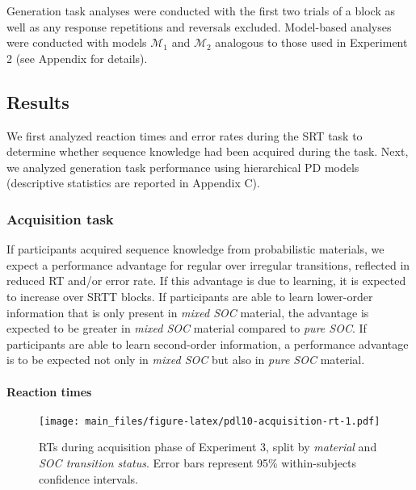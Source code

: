 \documentclass[man]{apa6}
\theoremstyle{definition}
\theoremstyle{definition}
\theoremstyle{definition}
\theoremstyle{remark}
\begin{document}
Generation task analyses were conducted with the first two trials of a
block as well as any response repetitions and reversals excluded.
Model-based analyses were conducted with models \(\mathcal{M}_1\) and
\(\mathcal{M}_2\) analogous to those used in Experiment 2 (see Appendix
for details).

\subsection{Results}\label{results-2}

We first analyzed reaction times and error rates during the SRT task to
determine whether sequence knowledge had been acquired during the task.
Next, we analyzed generation task performance using hierarchical PD
models (descriptive statistics are reported in Appendix C).

\subsubsection{Acquisition task}\label{acquisition-task-2}

If participants acquired sequence knowledge from probabilistic
materials, we expect a performance advantage for regular over irregular
transitions, reflected in reduced RT and/or error rate. If this
advantage is due to learning, it is expected to increase over SRTT
blocks. If participants are able to learn lower-order information that
is only present in \emph{mixed SOC} material, the advantage is expected
to be greater in \emph{mixed SOC} material compared to \emph{pure SOC}.
If participants are able to learn second-order information, a
performance advantage is to be expected not only in \emph{mixed SOC} but
also in \emph{pure SOC} material.

\paragraph{Reaction times}\label{reaction-times-2}

\begin{figure}[htbp]
\centering
\texttt{[image: main\_files/figure-latex/pdl10-acquisition-rt-1.pdf]}
\caption{\label{fig:pdl10-acquisition-rt}RTs during acquisition phase of
Experiment 3, split by \emph{material} and \emph{SOC transition status}.
Error bars represent 95\% within-subjects confidence intervals.}
\end{figure}
\end{document}
